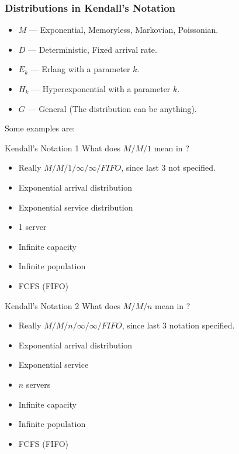 \subsubsection{Distributions in Kendall's Notation}\label{subsubsec:Distros_Kendalls_Notation}
\begin{itemize}[noitemsep]
\item $M$ --- Exponential, Memoryless, Markovian, Poissonian.
\item $D$ --- Deterministic, Fixed arrival rate.
\item $E_{k}$ --- Erlang with a parameter $k$.
\item $H_{k}$ --- Hyperexponential with a parameter $k$.
\item $G$ --- General (The distribution can be anything).
\end{itemize}

Some examples are:

\begin{example}[Lecture 3]{Kendall's Notation 1}
  What does $M/M/1$ mean in ?
  \tcblower{}
  \begin{itemize}[noitemsep]
  \item Really $M/M/1/\infty/\infty/FIFO$, since last 3 not specified.
  \item Exponential arrival distribution
  \item Exponential service distribution
  \item 1 server
  \item Infinite capacity
  \item Infinite population
  \item FCFS (FIFO)
  \end{itemize}
\end{example}

\begin{example}[Lecture 3]{Kendall's Notation 2}
  What does $M/M/n$ mean in ?
  \tcblower{}
  \begin{itemize}[noitemsep]
  \item Really $M/M/n/\infty/\infty/FIFO$, since last 3 notation specified.
  \item Exponential arrival distribution
  \item Exponential service
  \item $n$ servers
  \item Infinite capacity
  \item Infinite population
  \item FCFS (FIFO)
  \end{itemize}
\end{example}
  
